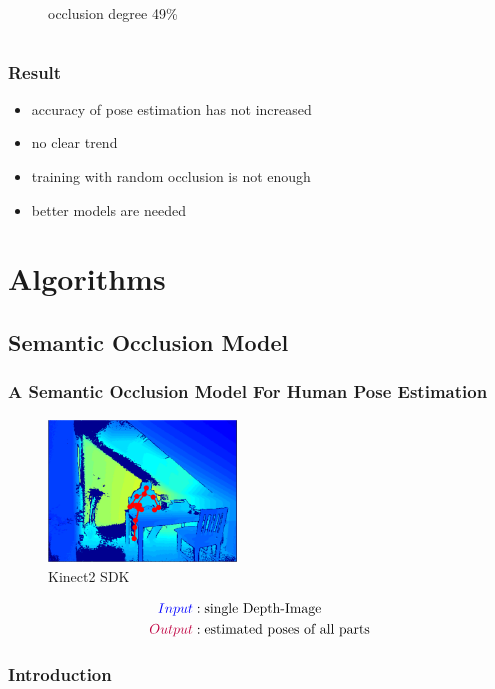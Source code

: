\documentclass[xcolor=dvipsnames]{beamer}
\begin{document}
\begin{frame}
\begin{columns}
\begin{column}{.5\textwidth}
\begin{figure}
				\caption{occlusion degree 49\%}
			\end{figure}
		\end{column}
	\end{columns}
\end{frame}

\begin{frame}
	\frametitle{Result}
	\Large
	
	\begin{itemize}
		\item accuracy of pose estimation has not increased
		\item no clear trend
		\item training with random occlusion is not enough
		\item better models are needed
	\end{itemize}
\end{frame}

\section{Algorithms}
\subsection{Semantic Occlusion Model}
{
\begin{frame}
	\frametitle{A Semantic Occlusion Model For Human Pose Estimation}
	\vline
	\Large

	\begin{figure}
		\includegraphics[width=5cm]{img/HPE.png}
		\caption{Kinect2 SDK}
	\end{figure}
		
	\begin{align*}
		\textcolor{blue}{Input}&:  \text{single Depth-Image} \\
		\textcolor{purple}{Output}&: \text{estimated poses of all parts}
	\end{align*}
\end{frame}}

\subsubsection{Introduction}
\end{document}

